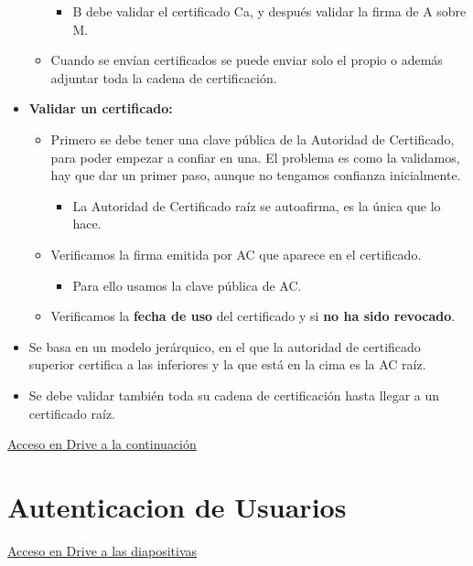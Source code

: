 \documentclass[12pt, twoside, openright]{report} %
\begin{document}
\begin{itemize}
\begin{itemize}
		            \begin{itemize}
			            \item B debe validar el certificado Ca, y después validar la firma de A sobre M.
		            \end{itemize}
		      \item Cuando se envían certificados se puede enviar solo el propio o además adjuntar toda la cadena de certificación.
	      \end{itemize}
	\item \textbf{Validar un certificado:}
	      \begin{itemize}
		      \item Primero se debe tener una clave pública de la Autoridad de Certificado, para poder empezar a confiar en una. El problema es como la validamos, hay que dar un primer paso, aunque no tengamos confianza inicialmente.
		            \begin{itemize}
			            \item La Autoridad de Certificado raíz se autoafirma, es la única que lo hace.
		            \end{itemize}
		      \item Verificamos la firma emitida por AC que aparece en el certificado.
		            \begin{itemize}
			            \item Para ello usamos la clave pública de AC.
		            \end{itemize}
		      \item Verificamos la \textbf{fecha de uso} del certificado y si \textbf{no ha sido revocado}.
	      \end{itemize}
	\item Se basa en un modelo jerárquico, en el que la autoridad de certificado superior certifica a las inferiores y la que está en la cima es la AC raíz.
	\item Se debe validar también toda su cadena de certificación hasta llegar a un certificado raíz.
\end{itemize}

\href{https://drive.google.com/file/d/1HCPXUgQZdJhzb-RSoEQ4a3lpcr0BL7Wh}{Acceso en Drive a la continuación}

\section{Autenticacion de Usuarios}
\href{https://drive.google.com/file/d/1LeW4zDzfHuWrtOJt_1oKhUiT8p8w9eY0}{Acceso en Drive a las diapositivas}
\end{document}

